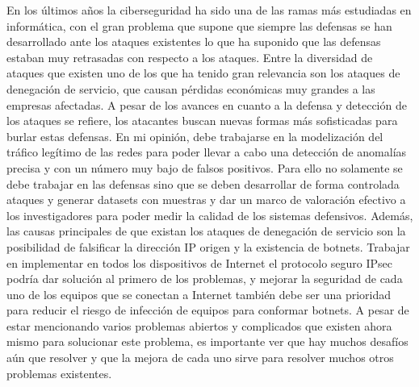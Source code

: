 En los últimos a\~nos la ciberseguridad ha sido una de las ramas más estudiadas en informática, con el gran problema que supone que siempre las defensas se han desarrollado ante los ataques existentes lo que ha suponido que las defensas estaban muy retrasadas con respecto a los ataques. Entre la diversidad de ataques que existen uno de los que ha tenido gran relevancia son los ataques de denegación de servicio, que causan pérdidas económicas muy grandes a las empresas afectadas. A pesar de los avances en cuanto a la defensa y detección de los ataques se refiere, los atacantes buscan nuevas formas más sofisticadas para burlar estas defensas. En mi opinión, debe trabajarse en la modelización del tráfico legítimo de las redes para poder llevar a cabo una detección de anomalías precisa y con un número muy bajo de falsos positivos. Para ello no solamente se debe trabajar en las defensas sino que se deben desarrollar de forma controlada ataques y generar datasets con muestras y dar un marco de valoración efectivo a los investigadores para poder medir la calidad de los sistemas defensivos. Además, las causas principales de que existan los ataques de denegación de servicio son la posibilidad de falsificar la dirección IP origen y la existencia de botnets. Trabajar en implementar en todos los dispositivos de Internet el protocolo seguro IPsec podría dar solución al primero de los problemas, y mejorar la seguridad de cada uno de los equipos que se conectan a Internet también debe ser una prioridad para reducir el riesgo de infección de equipos para conformar botnets. A pesar de estar mencionando varios problemas abiertos y complicados que existen ahora mismo para solucionar este problema, es importante ver que hay muchos desafíos aún que resolver y que la mejora de cada uno sirve para resolver muchos otros problemas existentes.
